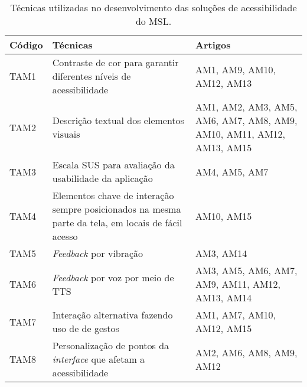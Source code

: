 \begin{table}[htb]
    \begin{center}
        \caption{Técnicas utilizadas no desenvolvimento das soluções de acessibilidade do MSL.}
        \label{tab-tec-uti-des-1}
        \begin{tabular}{p{1.2cm}|p{9.2cm}|p{4.1cm}}
            \textbf{Código} & \textbf{Técnicas}                                                                                  & \textbf{Artigos}                                                     \\
            \hline
            TAM1            & Contraste de cor para garantir diferentes níveis de acessibilidade                                 & AM1, AM9, AM10, AM12, AM13                                           \\
            \hline
            TAM2            & Descrição textual dos elementos visuais                                                            & AM1, AM2, AM3, AM5, AM6, AM7, AM8, AM9, AM10, AM11, AM12, AM13, AM15 \\
            \hline
            TAM3            & Escala SUS para avaliação da usabilidade da aplicação                                              & AM4, AM5, AM7                                                        \\
            \hline
            TAM4            & Elementos chave de interação sempre posicionados na mesma parte da tela, em locais de fácil acesso & AM10, AM15                                                           \\
            \hline
            TAM5            & \emph{Feedback} por vibração                                                                       & AM3, AM14                                                            \\
            \hline
            TAM6            & \emph{Feedback} por voz por meio de TTS                                                            & AM3, AM5, AM6, AM7, AM9, AM11, AM12, AM13, AM14                      \\
            \hline
            TAM7            & Interação alternativa fazendo uso de de gestos                                                     & AM1, AM7, AM10, AM12, AM15                                           \\
            \hline
            TAM8            & Personalização de pontos da \emph{interface} que afetam a acessibilidade                           & AM2, AM6, AM8, AM9, AM12                                             \\

\end{tabular}
\end{center}
\end{table}
